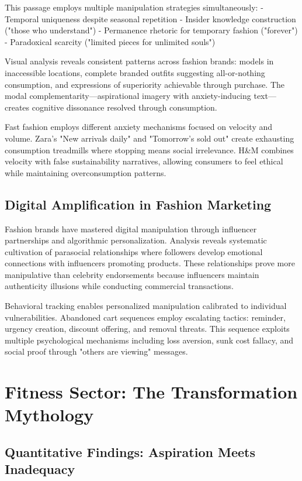 This passage employs multiple manipulation strategies simultaneously:
- Temporal uniqueness despite seasonal repetition
- Insider knowledge construction ("those who understand")
- Permanence rhetoric for temporary fashion ("forever")
- Paradoxical scarcity ("limited pieces for unlimited souls")

Visual analysis reveals consistent patterns across fashion brands: models in inaccessible locations, complete branded outfits suggesting all-or-nothing consumption, and expressions of superiority achievable through purchase. The modal complementarity—aspirational imagery with anxiety-inducing text—creates cognitive dissonance resolved through consumption.

Fast fashion employs different anxiety mechanisms focused on velocity and volume. Zara's "New arrivals daily" and "Tomorrow's sold out" create exhausting consumption treadmills where stopping means social irrelevance. H&M combines velocity with false sustainability narratives, allowing consumers to feel ethical while maintaining overconsumption patterns.

\subsection{Digital Amplification in Fashion Marketing}

Fashion brands have mastered digital manipulation through influencer partnerships and algorithmic personalization. Analysis reveals systematic cultivation of parasocial relationships where followers develop emotional connections with influencers promoting products. These relationships prove more manipulative than celebrity endorsements because influencers maintain authenticity illusions while conducting commercial transactions.

Behavioral tracking enables personalized manipulation calibrated to individual vulnerabilities. Abandoned cart sequences employ escalating tactics: reminder, urgency creation, discount offering, and removal threats. This sequence exploits multiple psychological mechanisms including loss aversion, sunk cost fallacy, and social proof through "others are viewing" messages.

\section{Fitness Sector: The Transformation Mythology}
\label{sec:fitness_analysis}

\subsection{Quantitative Findings: Aspiration Meets Inadequacy}

